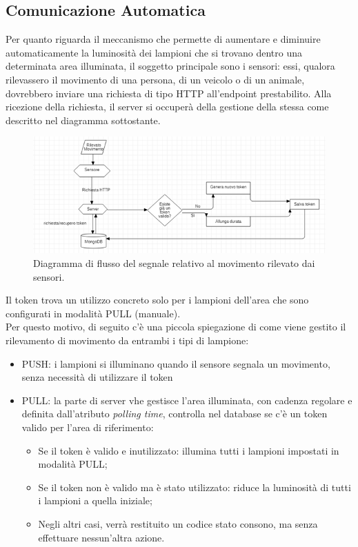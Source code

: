 \documentclass[a4paper, 11pt]{article}
\begin{document}
\subsection{Comunicazione Automatica}
Per quanto riguarda il meccanismo che permette di aumentare e diminuire automaticamente la luminosità dei lampioni che si trovano dentro una determinata area illuminata, il soggetto principale sono i sensori: essi, qualora rilevassero il movimento di una persona, di un veicolo o di un animale, dovrebbero inviare una richiesta di tipo HTTP all'endpoint prestabilito. Alla ricezione della richiesta, il server si occuperà della gestione della stessa come descritto nel diagramma sottostante.
\begin{figure}[H]
    \centering
    \includegraphics[width=\textwidth]{sensori}
    \caption{Diagramma di flusso del segnale relativo al movimento rilevato dai sensori.}
\end{figure}
Il token trova un utilizzo concreto solo per i lampioni dell'area che sono configurati in modalità PULL (manuale).\\ 
Per questo motivo, di seguito c'è una piccola spiegazione di come viene gestito il rilevamento di movimento da entrambi i tipi di lampione:
\begin{itemize}
    \item PUSH: i lampioni si illuminano quando il sensore segnala un movimento, senza necessità di utilizzare il token
    \item PULL: la parte di server vhe gestisce l'area illuminata, con cadenza regolare e definita dall'atributo \textit{polling time}, controlla nel database se c'è un token valido per l'area di riferimento:
    \begin{itemize}
        \item Se il token è valido e inutilizzato: illumina tutti i lampioni impostati in modalità PULL;
        \item Se il token non è valido ma è stato utilizzato: riduce la luminosità di tutti i lampioni a quella iniziale;
        \item Negli altri casi, verrà restituito un codice stato consono, ma senza effettuare nessun'altra azione.
    \end{itemize}
\end{itemize}
\end{document}
